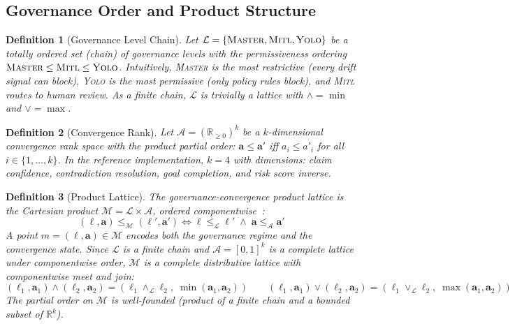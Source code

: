 \documentclass[11pt]{article}
\newtheorem{definition}{Definition}
\begin{document}
\subsection{Governance Order and Product Structure}

\begin{definition}[Governance Level Chain]
\label{def:gov-lattice}
Let $\mathcal{L} = \{\textsc{Master}, \textsc{Mitl}, \textsc{Yolo}\}$ be a totally ordered set (chain) of governance levels with the permissiveness ordering $\textsc{Master} \leq \textsc{Mitl} \leq \textsc{Yolo}$. Intuitively, \textsc{Master} is the most restrictive (every drift signal can block), \textsc{Yolo} is the most permissive (only policy rules block), and \textsc{Mitl} routes to human review. As a finite chain, $\mathcal{L}$ is trivially a lattice with $\wedge = \min$ and $\vee = \max$.
\end{definition}

\begin{definition}[Convergence Rank]
\label{def:conv-rank}
Let $\mathcal{A} = (\mathbb{R}_{\geq 0})^k$ be a $k$-dimensional convergence rank space with the product partial order: $\mathbf{a} \leq \mathbf{a}'$ iff $a_i \leq a'_i$ for all $i \in \{1, \ldots, k\}$. In the reference implementation, $k = 4$ with dimensions: claim confidence, contradiction resolution, goal completion, and risk score inverse.
\end{definition}

\begin{definition}[Product Lattice]
\label{def:product-lattice}
The \emph{governance-convergence product lattice} is the Cartesian product $\mathcal{M} = \mathcal{L} \times \mathcal{A}$, ordered componentwise~\cite{davey2002}:
\[
(\ell, \mathbf{a}) \leq_{\mathcal{M}} (\ell', \mathbf{a}') \iff \ell \leq_{\mathcal{L}} \ell' \;\wedge\; \mathbf{a} \leq_{\mathcal{A}} \mathbf{a}'
\]
A point $m = (\ell, \mathbf{a}) \in \mathcal{M}$ encodes both the governance regime and the convergence state. Since $\mathcal{L}$ is a finite chain and $\mathcal{A} = [0,1]^k$ is a complete lattice under componentwise order, $\mathcal{M}$ is a \emph{complete distributive lattice} with componentwise meet and join:
\[
(\ell_1,\mathbf{a}_1) \wedge (\ell_2,\mathbf{a}_2) = (\ell_1 \wedge_{\mathcal{L}} \ell_2,\; \min(\mathbf{a}_1,\mathbf{a}_2))
\qquad
(\ell_1,\mathbf{a}_1) \vee (\ell_2,\mathbf{a}_2) = (\ell_1 \vee_{\mathcal{L}} \ell_2,\; \max(\mathbf{a}_1,\mathbf{a}_2))
\]
The partial order on $\mathcal{M}$ is well-founded (product of a finite chain and a bounded subset of $\mathbb{R}^k$).
\end{definition}
\end{document}
